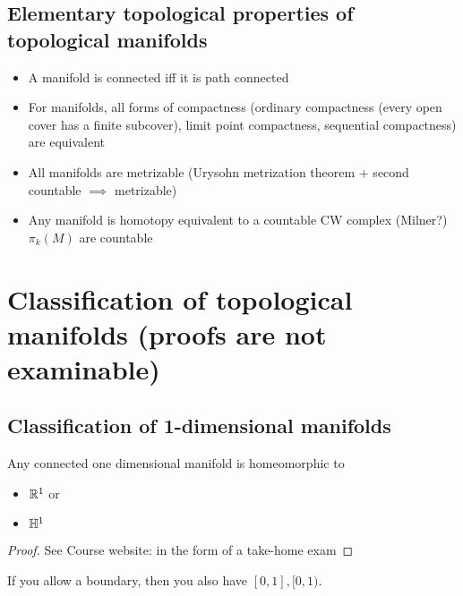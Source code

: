 \subsection{Elementary topological properties of topological manifolds}


\begin{itemize}
    \item A manifold is connected iff it is path connected 
    \item For manifolds, all forms of compactness (ordinary compactness (every open cover has a finite subcover), limit point compactness, sequential compactness) are equivalent
    \item All manifolds are metrizable (Urysohn metrization theorem + second countable \(\implies\) metrizable) 
    \item Any manifold is homotopy equivalent to a countable CW complex (Milner?) \(\pi_k(M)\) are countable
\end{itemize}

\section{Classification of topological manifolds (proofs are not examinable)}
\subsection{Classification of 1-dimensional manifolds}
\begin{theorem}\label{thm:1.9}
    Any connected one dimensional manifold is homeomorphic to  
    \begin{itemize}
        \item \(\mathbb{R}^1\) or
        \item \(\mathbb{H}^1\)
    \end{itemize}
\end{theorem}

\begin{proof}
    See Course website: \cite{gale_classification_takehome} in the form of a take-home exam
\end{proof}

\begin{remark}
    If you allow a boundary, then you also have \([0,1],[0,1)\). 
\end{remark}

